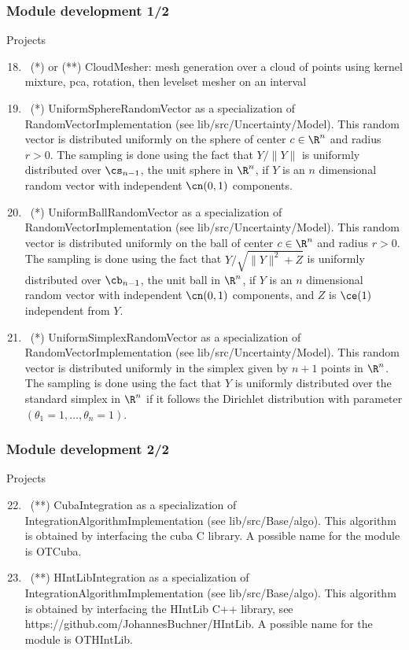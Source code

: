 \documentclass[8pt]{beamer}
\begin{document}
\begin{frame}
  \frametitle{Module development 1/2}
  \begin{block}{Projects}
    \begin{enumerate}
      \setcounter{enumi}{17}
    \item~(*) or (**) \alert{\ttfamily CloudMesher}: mesh generation over a cloud of points using kernel mixture, pca, rotation, then levelset mesher on an interval
    \item~(*) \alert{\ttfamily UniformSphereRandomVector} as a specialization of {\ttfamily RandomVectorImplementation} (see {\ttfamily lib/src/Uncertainty/Model}). This random vector is distributed uniformly on the sphere of center $c\in\R^n$ and radius $r>0$. The sampling is done using the fact that $Y/\|Y\|$ is uniformly distributed over $\cs_{n-1}$, the unit sphere in $\R^n$, if $Y$ is an $n$ dimensional random vector with independent $\cn(0,1)$ components.
    \item~(*) \alert{\ttfamily UniformBallRandomVector} as a specialization of {\ttfamily RandomVectorImplementation} (see {\ttfamily lib/src/Uncertainty/Model}). This random vector is distributed uniformly on the ball of center $c\in\R^n$ and radius $r>0$. The sampling is done using the fact that $Y/\sqrt{\|Y\|^2+Z}$ is uniformly distributed over $\cb_{n-1}$, the unit ball in $\R^n$, if $Y$ is an $n$ dimensional random vector with independent $\cn(0,1)$ components, and $Z$ is $\ce(1)$ independent from $Y$.
    \item~(*) \alert{\ttfamily UniformSimplexRandomVector} as a specialization of {\ttfamily RandomVectorImplementation} (see {\ttfamily lib/src/Uncertainty/Model}). This random vector is distributed uniformly in the simplex given by $n+1$ points in $\R^n$. The sampling is done using the fact that $Y$ is uniformly distributed over the standard simplex in $\R^n$ if it follows the Dirichlet distribution with parameter $(\theta_1=1,\dots,\theta_n=1)$.
    \end{enumerate}
  \end{block}
\end{frame}

\begin{frame}
  \frametitle{Module development 2/2}
  \begin{block}{Projects}
    \begin{enumerate}
      \setcounter{enumi}{21}
    \item~(**) \alert{\ttfamily CubaIntegration} as a specialization of {\ttfamily IntegrationAlgorithmImplementation} (see {\ttfamily lib/src/Base/algo}). This algorithm is obtained by interfacing the cuba C library. A possible name for the module is \alert{OTCuba}.
    \item~(**) \alert{\ttfamily HIntLibIntegration} as a specialization of {\ttfamily IntegrationAlgorithmImplementation} (see {\ttfamily lib/src/Base/algo}). This algorithm is obtained by interfacing the HIntLib C++ library, see \alert{https://github.com/JohannesBuchner/HIntLib}. A possible name for the module is \alert{OTHIntLib}.
    \end{enumerate}
  \end{block}
\end{frame}
\end{document}
